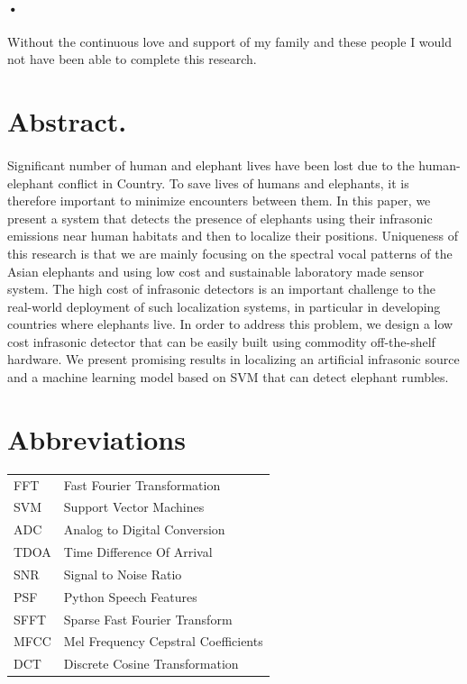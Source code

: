 \documentclass[12pt]{article}
\numberwithin{figure}{section}
\numberwithin{table}{section}
\begin{document}
\paragraph{•}
Without the continuous love and support of my family and these people I would not have been
able to complete this research.

\newpage
\section*{Abstract.}

\paragraph{}
Significant number of human and elephant lives have
been lost due to the human-elephant conflict in Country. To
save lives of humans and elephants, it is therefore important
to minimize encounters between them. In this paper,
we present a system that detects the presence of elephants
using their infrasonic emissions near human habitats
and then to localize their positions. Uniqueness of this research is that we are mainly focusing on the spectral vocal patterns of the Asian elephants and using low cost and sustainable laboratory made sensor system. The high cost of infrasonic detectors is an important challenge to the real-world
deployment of such localization systems, in particular in developing
countries where elephants live. In order to address
this problem, we design a low cost infrasonic detector that
can be easily built using commodity off-the-shelf hardware.
We present promising results in localizing an artificial infrasonic
source and a machine learning model based on SVM that can detect elephant rumbles.

\newpage
\tableofcontents

\newpage
\listoffigures

\newpage
\section*{Abbreviations}

\begin{tabular}{l l}
FFT & Fast Fourier Transformation\\
SVM & Support Vector Machines \\
ADC & Analog to Digital Conversion \\
TDOA & Time Difference Of Arrival \\
SNR & Signal to Noise Ratio \\
PSF & Python Speech Features \\
SFFT & Sparse Fast Fourier Transform \\
MFCC & Mel Frequency Cepstral Coefficients \\
DCT & Discrete Cosine Transformation \\
\end{tabular}
\end{document}
